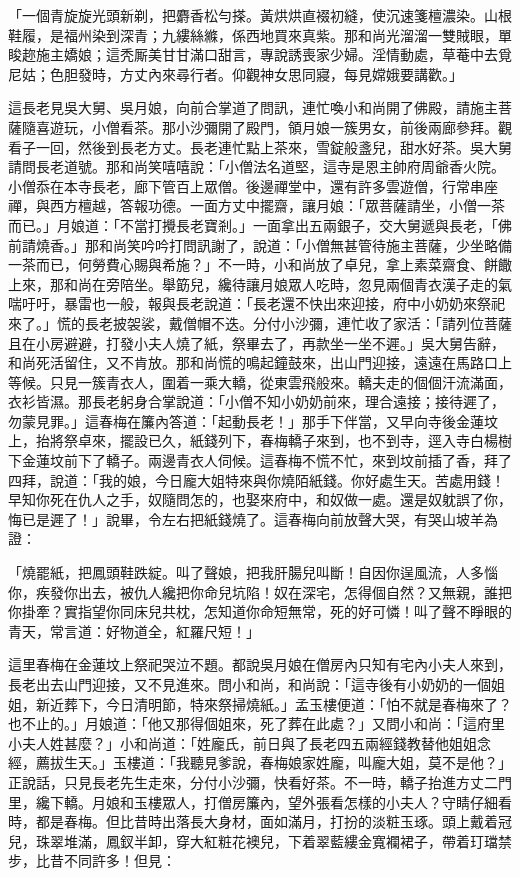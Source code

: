 \begin{showcontents}{}
「一個青旋旋光頭新剃，把麝香松勻搽。黃烘烘直裰初縫，使沉速箋檀濃染。山根鞋履，是福州染到深青；九縷絲縧，係西地買來真紫。那和尚光溜溜一雙賊眼，單睃趂施主嬌娘；這秃厮美甘甘滿口甜言，專說誘喪家少婦。淫情動處，草菴中去覓尼姑；色胆發時，方丈內來尋行者。仰觀神女思同寢，每見嫦娥要講歡。」

這長老見吳大舅、吳月娘，向前合掌道了問訊，連忙喚小和尚開了佛殿，請施主菩薩隨喜遊玩，小僧看茶。那小沙彌開了殿門，領月娘一簇男女，前後兩廊參拜。觀看子一回，然後到長老方丈。長老連忙點上茶來，雪錠般盞兒，甜水好茶。吳大舅請問長老道號。那和尚笑嘻嘻說：「小僧法名道堅，這寺是恩主帥府周爺香火院。小僧忝在本寺長老，廊下管百上眾僧。後邊禪堂中，還有許多雲遊僧，行常串座禪，與西方檀越，答報功德。一面方丈中擺齋，讓月娘：「眾菩薩請坐，小僧一茶而已。」月娘道：「不當打攪長老寶剎。」一面拿出五兩銀子，交大舅遞與長老，「佛前請燒香。」那和尚笑吟吟打問訊謝了，說道：「小僧無甚管待施主菩薩，少坐略備一茶而已，何勞費心賜與希施？」不一時，小和尚放了卓兒，拿上素菜齋食、餅饊上來，那和尚在旁陪坐。舉筯兒，纔待讓月娘眾人吃時，忽見兩個青衣漢子走的氣喘吁吁，暴雷也一般，報與長老說道：「長老還不快出來迎接，府中小奶奶來祭祀來了。」慌的長老披袈裟，戴僧帽不迭。分付小沙彌，連忙收了家活：「請列位菩薩且在小房避避，打發小夫人燒了紙，祭畢去了，再款坐一坐不遲。」吳大舅告辭，和尚死活留住，又不肯放。那和尚慌的鳴起鐘鼓來，出山門迎接，遠遠在馬路口上等候。只見一簇青衣人，圍着一乘大轎，從東雲飛般來。轎夫走的個個汗流滿面，衣衫皆濕。那長老躬身合掌說道：「小僧不知小奶奶前來，理合遠接；接待遲了，勿蒙見罪。」這春梅在簾內答道：「起動長老！」那手下伴當，又早向寺後金蓮坟上，抬將祭卓來，擺設已久，紙錢列下，春梅轎子來到，也不到寺，逕入寺白楊樹下金蓮坟前下了轎子。兩邊青衣人伺候。這春梅不慌不忙，來到坟前插了香，拜了四拜，說道：「我的娘，今日龐大姐特來與你燒陌紙錢。你好處生天。苦處用錢！早知你死在仇人之手，奴隨問怎的，也娶來府中，和奴做一處。還是奴躭誤了你，悔已是遲了！」說畢，令左右把紙錢燒了。這春梅向前放聲大哭，有哭山坡羊為證：

「燒罷紙，把鳳頭鞋跌綻。叫了聲娘，把我肝腸兒叫斷！自因你逞風流，人多惱你，疾發你出去，被仇人纔把你命兒坑陷！奴在深宅，怎得個自然？又無親，誰把你掛牽？實指望你同床兒共枕，怎知道你命短無常，死的好可憐！叫了聲不睜眼的青天，常言道：好物道全，紅羅尺短！」

這里春梅在金蓮坟上祭祀哭泣不題。都說吳月娘在僧房內只知有宅內小夫人來到，長老出去山門迎接，又不見進來。問小和尚，和尚說：「這寺後有小奶奶的一個姐姐，新近葬下，今日清明節，特來祭掃燒紙。」孟玉樓便道：「怕不就是春梅來了？也不止的。」月娘道：「他又那得個姐來，死了葬在此處？」又問小和尚：「這府里小夫人姓甚麼？」小和尚道：「姓龐氏，前日與了長老四五兩經錢教替他姐姐念經，薦拔生天。」玉樓道：「我聽見爹說，春梅娘家姓龐，叫龐大姐，莫不是他？」正說話，只見長老先生走來，分付小沙彌，快看好茶。不一時，轎子抬進方丈二門里，纔下轎。月娘和玉樓眾人，打僧房簾內，望外張看怎樣的小夫人？守睛仔細看時，都是春梅。但比昔時出落長大身材，面如滿月，打扮的淡粧玉琢。頭上戴着冠兒，珠翠堆滿，鳳釵半卸，穿大紅粧花襖兒，下着翠藍縷金寬襴裙子，帶着玎璫禁步，比昔不同許多！但見：


\end{showcontents}
